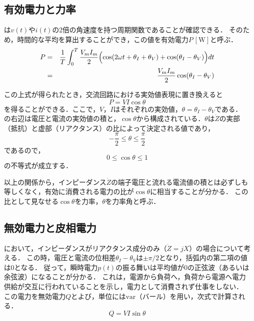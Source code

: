 \documentclass[11pt,dvipdfmx]{ujarticle}
\begin{document}
\subsection{有効電力と力率}
は$v(t)$や$i(t)$の2倍の角速度を持つ周期関数であることが確認できる．
そのため，時間的な平均を算出することができ，この値を有効電力$P\,[\mathrm{W}]$と呼ぶ．
\begin{eqnarray}
	P &=& \frac{1}{T}\int_0^T \frac{V_mI_m}{2}\Bigl(\cos(2\omega t + \theta_I+\theta_V)+\cos(\theta_I - \theta_V)\Bigr) dt\nonumber\\
	&=&\frac{V_mI_m}{2}\cos(\theta_I - \theta_V)
\end{eqnarray}

この上式が得られたとき，交流回路における実効値表現に置き換えると
\begin{equation}
	P = VI\cos\theta
	\label{eq:power}
\end{equation}
を得ることができる．ここで，$V$，$I$はそれぞれの実効値，$\theta=\theta_I-\theta_V$である．
の右辺は電圧と電流の実効値の積と，$\cos\theta$から構成されている．$\theta$は$\dot{Z}$の実部（抵抗）と虚部（リアクタンス）の比によって決定される値であり，
\begin{equation}
	-\frac{\pi}{2}\leq\theta\leq\frac{\pi}{2}
\end{equation}
であるので，
\begin{equation}
	0\leq\cos\theta\leq 1
\end{equation}
の不等式が成立する．

以上の関係から，インピーダンス$\dot{Z}$の端子電圧と流れる電流値の積とは必ずしも等しくなく，有効に消費される電力の比が$\cos\theta$に相当することが分かる．
この比として見なせる$\cos\theta$を力率，$\theta$を力率角と呼ぶ．

\subsection{無効電力と皮相電力}
において，インピーダンスがリアクタンス成分のみ（$\dot{Z}=jX$）の場合について考える．
この時，電圧と電流の位相差$\theta_I-\theta_V$は$\pm\pi/2$となり，括弧内の第二項の値は0となる．
従って，瞬時電力$p(t)$の振る舞いは平均値が0の正弦波（あるいは余弦波）になることが分かる．
これは，電源から負荷へ，負荷から電源へ電力供給が交互に行われていることを示し，電力として消費されず仕事をしない．
この電力を無効電力$Q$とよび，単位には$\mathrm{var}$（バール）を用い，次式で計算される．
\begin{equation}
	Q = VI \sin \theta
\end{equation}
\end{document}
